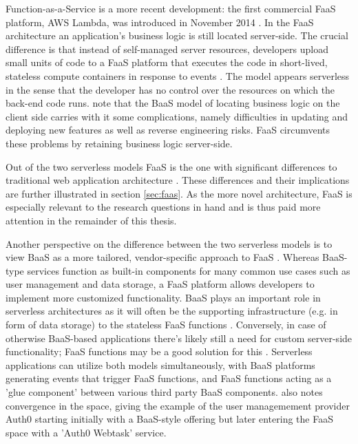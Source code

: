 \documentclass[utf8,english]{gradu3}
\begin{document}
Function-as-a-Service is a more recent development: the first commercial FaaS platform, AWS Lambda, was introduced in November 2014 \parencite{awslambda0218}. In the FaaS architecture an application's business logic is still located server-side. The crucial difference is that instead of self-managed server resources, developers upload small units of code to a FaaS platform that executes the code in short-lived, stateless compute containers in response to events \parencite{robert2016serverlessarchitectures}. The model appears serverless in the sense that the developer has no control over the resources on which the back-end code runs. \textcite{albuquerque17faaspaas} note that the BaaS model of locating business logic on the client side carries with it some complications, namely difficulties in updating and deploying new features as well as reverse engineering risks. FaaS circumvents these problems by retaining business logic server-side.

Out of the two serverless models FaaS is the one with significant differences to traditional web application architecture \parencite{robert2016serverlessarchitectures}. These differences and their implications are further illustrated in section \ref{sec:faas}. As the more novel architecture, FaaS is especially relevant to the research questions in hand and is thus paid more attention in the remainder of this thesis.

Another perspective on the difference between the two serverless models is to view BaaS as a more tailored, vendor-specific approach to FaaS \parencite{van2017spec}. Whereas BaaS-type services function as built-in components for many common use cases such as user management and data storage, a FaaS platform allows developers to implement more customized functionality. BaaS plays an important role in serverless architectures as it will often be the supporting infrastructure (e.g. in form of data storage) to the stateless FaaS functions \parencite{cncf18serverlessWG}. Conversely, in case of otherwise BaaS-based applications there's likely still a need for custom server-side functionality; FaaS functions may be a good solution for this \parencite{robert2016serverlessarchitectures}. Serverless applications can utilize both models simultaneously, with BaaS platforms generating events that trigger FaaS functions, and FaaS functions acting as a 'glue component' between various third party BaaS components. \textcite{robert2016serverlessarchitectures} also notes convergence in the space, giving the example of the user managemement provider Auth0 starting initially with a BaaS-style offering but later entering the FaaS space with a 'Auth0 Webtask' service.
\end{document}
